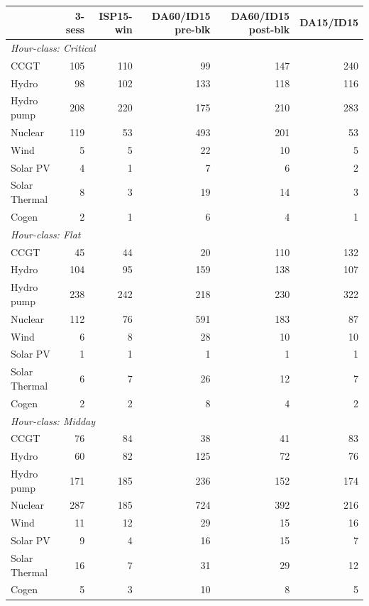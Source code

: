 \begin{tabular}{l r r r r r}
\toprule
 & 3-sess & ISP15-win & DA60/ID15 pre-blk & DA60/ID15 post-blk & DA15/ID15 \\
\midrule
\multicolumn{6}{l}{\textit{Hour-class: Critical}} \\
CCGT & 105 & 110 & 99 & 147 & 240 \\
Hydro & 98 & 102 & 133 & 118 & 116 \\
Hydro pump & 208 & 220 & 175 & 210 & 283 \\
Nuclear & 119 & 53 & 493 & 201 & 53 \\
Wind & 5 & 5 & 22 & 10 & 5 \\
Solar PV & 4 & 1 & 7 & 6 & 2 \\
Solar Thermal & 8 & 3 & 19 & 14 & 3 \\
Cogen & 2 & 1 & 6 & 4 & 1 \\
\midrule
\multicolumn{6}{l}{\textit{Hour-class: Flat}} \\
CCGT & 45 & 44 & 20 & 110 & 132 \\
Hydro & 104 & 95 & 159 & 138 & 107 \\
Hydro pump & 238 & 242 & 218 & 230 & 322 \\
Nuclear & 112 & 76 & 591 & 183 & 87 \\
Wind & 6 & 8 & 28 & 10 & 10 \\
Solar PV & 1 & 1 & 1 & 1 & 1 \\
Solar Thermal & 6 & 7 & 26 & 12 & 7 \\
Cogen & 2 & 2 & 8 & 4 & 2 \\
\midrule
\multicolumn{6}{l}{\textit{Hour-class: Midday}} \\
CCGT & 76 & 84 & 38 & 41 & 83 \\
Hydro & 60 & 82 & 125 & 72 & 76 \\
Hydro pump & 171 & 185 & 236 & 152 & 174 \\
Nuclear & 287 & 185 & 724 & 392 & 216 \\
Wind & 11 & 12 & 29 & 15 & 16 \\
Solar PV & 9 & 4 & 16 & 15 & 7 \\
Solar Thermal & 16 & 7 & 31 & 29 & 12 \\
Cogen & 5 & 3 & 10 & 8 & 5 \\
\midrule
\bottomrule
\end{tabular}
